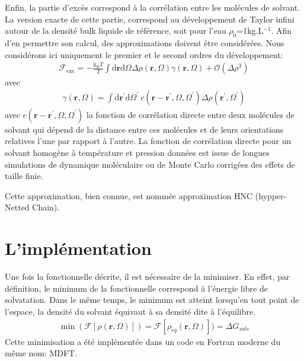 Enfin, la partie d'excès correspond à la corrélation entre les molécules de solvant. La version exacte de cette partie, correspond au développement de Taylor infini autour de la densité bulk liquide de référence, soit pour l'eau $\rho_0$=1kg.L$^{-1}$. Afin d'en permettre son calcul, des approximations doivent être considérées. Nous considérons ici uniquement le premier et le second ordres du développement:
\begin{eqnarray}
\mathcal{F}_\mathrm{exc} = -\frac{\mathrm{k_B}T}{2}\int\mathrm{d}\boldsymbol{r}\mathrm{d}\Omega \Delta\rho\left(\boldsymbol{r}, \Omega   \right) \gamma \left(\boldsymbol{r},\Omega\right)  + \mathcal{O}(\Delta\rho^{3})
\label{eq:fonctionnelle:exc}
\end{eqnarray}
\noindent avec
\begin{eqnarray}
\gamma \left(\boldsymbol{r},\Omega\right) = \int\mathrm{d}\boldsymbol{r}^\prime\mathrm{d}\Omega^\prime\  c\left(\boldsymbol{r}-\boldsymbol{r}^\prime,\Omega,\Omega^\prime \right) \Delta\rho\left(\boldsymbol{r}^\prime, \Omega^\prime \right)
\end{eqnarray}
\noindent avec $c\left(\boldsymbol{r}-\boldsymbol{r}^\prime,\Omega,\Omega^\prime \right) $ la fonction de corrélation directe entre deux molécules de solvant qui dépend de la distance entre ces molécules et de leurs orientations relatives l'une par rapport à l'autre. La fonction de corrélation directe pour un solvant homogène à température et pression données est issue de longues simulations de dynamique moléculaire ou de Monte Carlo corrigées des effets de taille finie\cite{Puibasset_bridge_2012, belloni_unpublished}.

Cette approximation, bien connue, est nommée approximation HNC (hypper-Netted Chain)\cite{hansen_theory_2006}. 


\section{L'implémentation}
Une fois la fonctionnelle décrite, il est nécessaire de la minimiser. En effet, par définition, le minimum de la fonctionnelle correspond à l'énergie libre de solvatation. Dans le même temps, le minimum est atteint lorsqu'en tout point de l'espace, la densité du solvant équivaut à sa densité dite à l'équilibre.
\begin{eqnarray}
\min(\mathcal{F}[\rho\left(\boldsymbol{r},\Omega \right)]) = \mathcal{F}[\rho_{eq}\left(\boldsymbol{r},\Omega \right)])= \Delta G_{solv}
\end{eqnarray}
Cette minimisation a été implémentée dans un code en Fortran moderne du même nom: MDFT.


